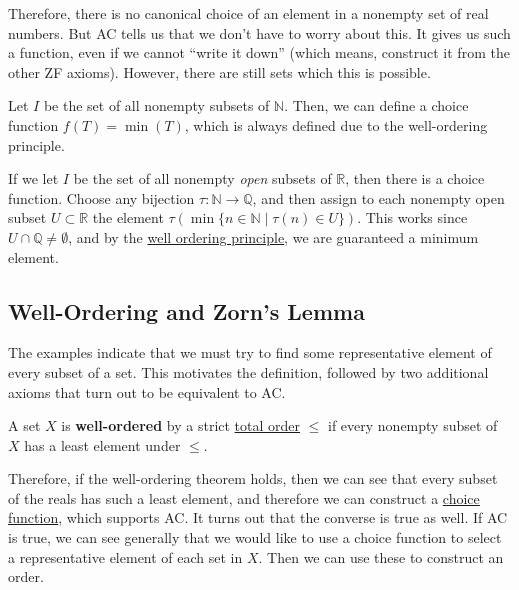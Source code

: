   Therefore, there is no canonical choice of an element in a nonempty set of real numbers. But AC tells us that we don't have to worry about this. It gives us such a function, even if we cannot ``write it down'' (which means, construct it from the other ZF axioms).  However, there are still sets which this is possible. 

  \begin{example}
    \label{ex:choice-function-on-power-set-of-naturals}
    Let $I$ be the set of all nonempty subsets of $\mathbb{N}$. Then, we can define a choice function $f(T) = \min(T)$, which is always defined due to the well-ordering principle. 
  \end{example}

  \begin{example}
    \label{ex:choice-function-on-open-sets-of-reals}
    If we let $I$ be the set of all nonempty \textit{open} subsets of $\mathbb{R}$, then there is a choice function. Choose any bijection $\tau: \mathbb{N} \rightarrow \mathbb{Q}$, and then assign to each nonempty open subset $U \subset \mathbb{R}$ the element $\tau (\min\{n \in \mathbb{N} \mid \tau(n) \in U\})$. This works since $U \cap \mathbb{Q} \neq \emptyset$, and by the \hyperref[thm:well-ordering-principle]{well ordering principle}, we are guaranteed a minimum element. 
  \end{example} 

\subsection{Well-Ordering and Zorn's Lemma}

  The examples indicate that we must try to find some representative element of every subset of a set. This motivates the definition, followed by two additional axioms that turn out to be equivalent to AC. 

  \begin{definition}
    \label{def:well-ordered}
    A set $X$ is \textbf{well-ordered} by a strict \hyperref[def:total-order]{total order} $\leq$ if every nonempty subset of $X$ has a least element under $\leq$. 
  \end{definition}

  Therefore, if the well-ordering theorem holds, then we can see that every subset of the reals has such a least element, and therefore we can construct a \hyperref[def:choice-function]{choice function}, which supports AC. It turns out that the converse is true as well. If AC is true, we can see generally that we would like to use a choice function to select a representative element of each set in $X$. Then we can use these to construct an order. 

